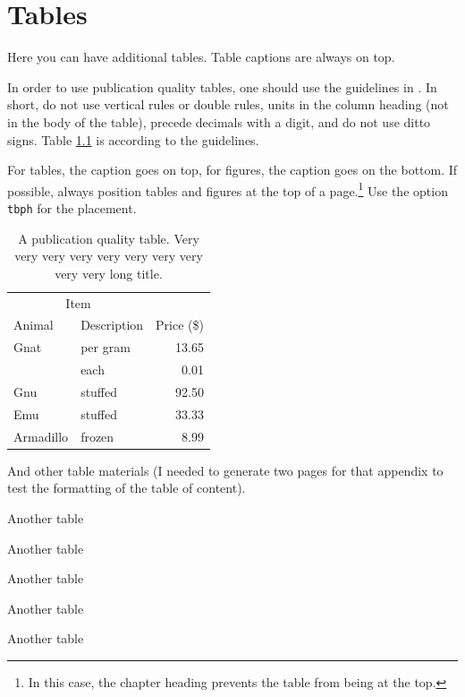 \documentclass[msc,oneside]{ubcthesis}%
\begin{document}


\chapter{Tables}
Here you can have additional tables. Table captions are always on top.

In order to use publication quality tables, one should use the guidelines in \cite{Fear:2005manual}. In short, do not use vertical rules or double rules, units in the column heading (not in the body of the table), precede decimals with a digit, and do not use ditto signs. Table \ref{table:food} is according to the guidelines. 

For tables, the caption goes on top, for figures, the caption goes on the bottom. If possible, always position tables and figures at the top of a page.\footnote{In this case, the chapter heading prevents the table from being at the top.} Use the option \verb|tbph| for the placement.

\begin{table}[tbph]
\centering
\caption{A publication quality table. Very very very very very very very very very very long title.
\label{table:food}}
\begin{tabular}{@{}llr@{}} \toprule 
\multicolumn{2}{c}{Item} \\ \cmidrule(r){1-2} 
Animal & Description & Price (\$)\\ \midrule 
Gnat & per gram & 13.65 \\ 
& each & 0.01 \\ 
Gnu & stuffed & 92.50 \\ 
Emu & stuffed & 33.33 \\ 
Armadillo & frozen & 8.99 \\ \bottomrule 
\end{tabular}
\end{table}

\newpage
And other table materials (I needed to generate two pages for that appendix to test the formatting of the table of content).

\begin{table}
\caption{Another table}
\end{table}

\begin{table}
\caption{Another table}
\end{table}
\begin{table}
\caption{Another table}
\end{table}
\begin{table}
\caption{Another table}
\end{table}
\begin{table}
\caption{Another table}
\end{table}
\end{document}
